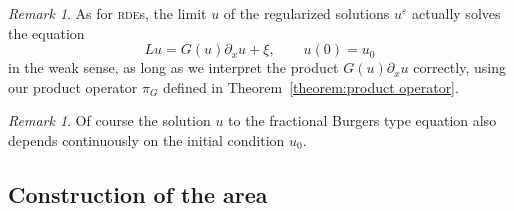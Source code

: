\documentclass[11pt,a4paper]{article}
\newcommand{\mathD}{\mathrm{D}}
\newcommand{\mathd}{\mathrm{d}}
\theoremstyle{remark}
\newtheorem{remark}[theorem]{Remark}
\newcommand{\R}{\mathbb{R}}
\newcommand{\Z}{\mathbb{Z}}
\newcommand{\E}{\mathbb{E}}
\newcommand{\CC}{\ensuremath{\mathscr{C}}}
\newcommand{\CF}{\ensuremath{\mathscr{F}}}
\begin{document}
\begin{remark}
  As for \textsc{rde}s, the limit $u$ of the regularized solutions $u^{\varepsilon}$ actually solves the equation
  \[
     L u=G ( u ) \partial_{x} u+ \xi , \hspace{2em} u ( 0 ) =u_{0}
  \]
  in the weak sense, as long as we interpret the product $G ( u ) \partial_{x} u$ correctly, using our product operator $\pi_{G}$ defined in
  Theorem~\ref{theorem:product operator}.
\end{remark}

\begin{remark}
   Of course the solution $u$ to the fractional Burgers type equation also depends continuously on the initial condition $u_0$.
\end{remark}






\subsection{Construction of the area}

%
\end{document}
